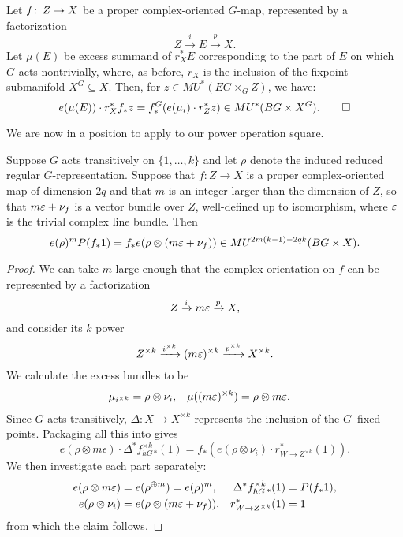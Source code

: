 \begin{lemma}\label{ProperCOIntersectionFormula}
Let $f\colon\thinspace Z \to X$ be a proper complex-oriented $G$-map, represented by a factorization \[Z \xrightarrow i E \xrightarrow p X.\]  Let $\mu(E)$ be excess summand of $r_X^* E$ corresponding to the part of $E$ on which $G$ acts nontrivially, where, as before, $r_X$ is the inclusion of the fixpoint submanifold $X^G \subseteq X$.  Then, for $z \in MU^*(EG \times_G Z)$, we have: \[e(\mu(E)) \cdot r_X^* f_* z = f^G_*(e(\mu_i) \cdot r_Z^* z) \in MU^*(BG \times X^G). \qed\]
\end{lemma}

We are now in a position to apply  to our power operation square.

\begin{lemma}\label{PowerOpAndEulerClasses}
Suppose $G$ acts transitively on $\{1, \ldots, k\}$ and let $\rho$ denote the induced reduced regular $G$-representation. Suppose that $f: Z \to X$ is a proper complex-oriented map of dimension $2q$ and that $m$ is an integer larger than the dimension of $Z$, so that $m \varepsilon + \nu_f$ is a vector bundle over $Z$, well-defined up to isomorphism, where $\varepsilon$ is the trivial complex line bundle. Then \[e(\rho)^m P(f_* 1) = f_* e(\rho \otimes (m \varepsilon + \nu_f)) \in MU^{2m(k-1)-2qk}(BG \times X).\]
\end{lemma}
\begin{proof}
We can take $m$ large enough that the complex-orientation on $f$ can be represented by a factorization \[Z \xrightarrow i m \varepsilon \xrightarrow p X,\] and consider its $k${\th} power \[Z^{\times k} \xrightarrow{i^{\times k}} (m \varepsilon)^{\times k} \xrightarrow{p^{\times k}} X^{\times k}.\]  We calculate the excess bundles to be
\begin{align*}
\mu_{i^{\times k}} & = \rho \otimes \nu_i, &
\mu((m \varepsilon)^{\times k}) & = \rho \otimes m \varepsilon.
\end{align*}
Since $G$ acts transitively, $\Delta: X \to X^{\times k}$ represents the inclusion of the $G$--fixed points.  Packaging all this into  gives \[e(\rho \otimes m\epsilon) \cdot \Delta^* f^{\times k}_{hG}{}_*(1) = f_*(e(\rho \otimes \nu_i) \cdot r_{W \to Z^{\times k}}^*(1)).\]
We then investigate each part separately:
\begin{align*}
e(\rho \otimes m\varepsilon) & = e(\rho^{\oplus m}) = e(\rho)^m, &
\Delta^* f^{\times k}_{hG} {}_*(1) & = P(f_* 1), \\
e(\rho \otimes \nu_i) & = e(\rho \otimes (m \varepsilon + \nu_f)), &
r^*_{W \to Z^{\times k}}(1) & = 1
\end{align*}
from which the claim follows.
\end{proof}


